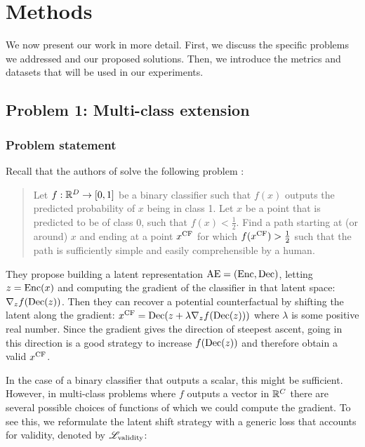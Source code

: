 \documentclass[../main.tex]{subfiles}
\begin{document}
\chapter{Methods}
\label{ch:methods}

We now present our work in more detail.
First, we discuss the specific problems we addressed and our proposed solutions.
Then, we introduce the metrics and datasets that will be used in our experiments.

\section{Problem 1: Multi-class extension}

\subsection{Problem statement}

Recall that the authors of \ls{} solve the following problem \cite{cohenGifsplanation2022}:

\begin{quote}
Let $f: \mathbb{R}^D \to [0, 1]$ be a binary classifier such that $f(x)$ outputs the predicted probability of $x$ being in class 1.
Let $x$ be a point that is predicted to be of class 0, \ie{} such that $f(x) < \frac{1}{2}$.
Find a path starting at (or around) $x$ and ending at a point $x^\mathrm{CF}$ for which $f(x^\mathrm{CF}) > \frac{1}{2}$ such that the path is sufficiently simple and easily comprehensible by a human.
\end{quote}

They propose building a latent representation $\mathrm{AE} = (\operatorname{Enc}, \operatorname{Dec})$, letting $z = \operatorname{Enc}(x)$ and computing the gradient of the classifier in that latent space:
$\nabla_z f(\operatorname{Dec}(z))$.
Then they can recover a potential counterfactual by shifting the latent along the gradient: $x^\mathrm{CF} = \operatorname{Dec}(z + \lambda \nabla_z f(\operatorname{Dec}(z)))$ where $\lambda$ is some positive real number.
Since the gradient gives the direction of steepest ascent, going in this direction is a good strategy to increase $f(\operatorname{Dec}(z))$ and therefore obtain a valid $x^\mathrm{CF}$.

In the case of a binary classifier that outputs a scalar, this might be sufficient. However, in multi-class problems where $f$ outputs a vector in $\mathbb{R}^C$ there are several possible choices of functions of which we could compute the gradient.
To see this, we reformulate the latent shift strategy with a generic loss that accounts for validity, denoted by $\mathscr{L}_\text{validity}$:
\end{document}

